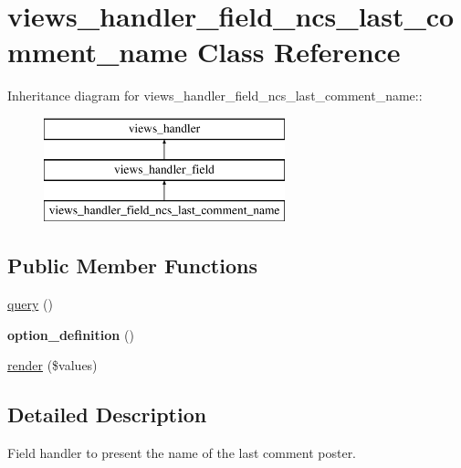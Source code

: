 \hypertarget{classviews__handler__field__ncs__last__comment__name}{
\section{views\_\-handler\_\-field\_\-ncs\_\-last\_\-comment\_\-name Class Reference}
\label{classviews__handler__field__ncs__last__comment__name}
}
Inheritance diagram for views\_\-handler\_\-field\_\-ncs\_\-last\_\-comment\_\-name::\begin{figure}[H]
\begin{center}
\leavevmode
\includegraphics[height=3cm]{classviews__handler__field__ncs__last__comment__name}
\end{center}
\end{figure}
\subsection*{Public Member Functions}
\begin{DoxyCompactItemize}
\item 
\hyperlink{classviews__handler__field__ncs__last__comment__name_a5394581513de0ee85a28aef8de302842}{query} ()
\item 
\hypertarget{classviews__handler__field__ncs__last__comment__name_aef3ee7ac3c57f689148d8909e0a3a3df}{
{\bfseries option\_\-definition} ()}
\label{classviews__handler__field__ncs__last__comment__name_aef3ee7ac3c57f689148d8909e0a3a3df}

\item 
\hyperlink{classviews__handler__field__ncs__last__comment__name_aeb44418e481bfca1f6dbb249a1f5c665}{render} (\$values)
\end{DoxyCompactItemize}


\subsection{Detailed Description}
Field handler to present the name of the last comment poster. 

